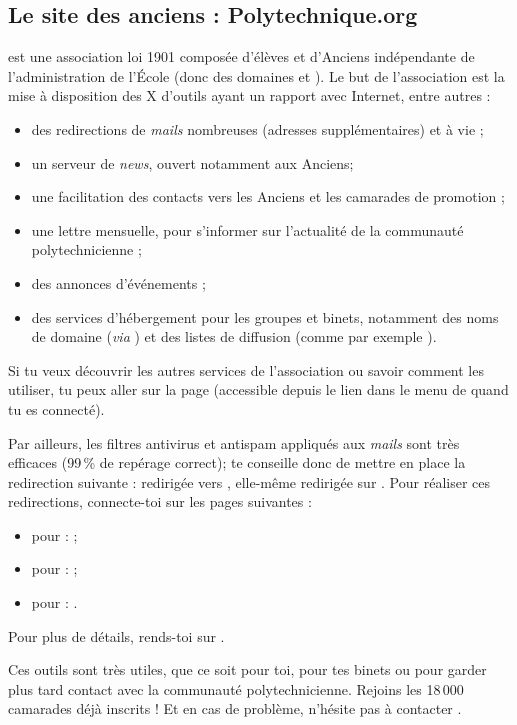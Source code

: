 \subsection{Le site des anciens : Polytechnique.org}
 est une association loi 1901 composée d'élèves et d'Anciens
 indépendante de l'administration de l'\'Ecole (donc des domaines 
 et ). Le but de l'association est la mise à disposition des X d'outils
ayant un rapport avec Internet, entre autres :
\begin{itemize}
  \item des redirections de \emph{mails} nombreuses (adresses supplémentaires) et à vie ;
  \item un serveur de \emph{news}, ouvert notamment aux Anciens;
  \item une facilitation des contacts vers les Anciens et les camarades de promotion ;
  \item une lettre mensuelle, pour s'informer sur l'actualité de la communauté polytechnicienne ;
  \item des annonces d'événements ;
  \item des services d'hébergement pour les groupes et binets, notamment des noms de domaine (\emph{via} ) et des listes de diffusion (comme par exemple ).
\end{itemize}
Si tu veux découvrir les autres services de l'association ou savoir
comment les utiliser, tu peux aller sur la page
 (accessible depuis
le lien  dans le menu de 
quand tu es connecté).

Par ailleurs, les filtres antivirus et antispam appliqués aux \emph{mails} sont très efficaces (99\,\% de repérage correct);  te conseille donc de mettre en place la redirection suivante :
redirigée vers ,
elle-même redirigée sur .
Pour réaliser ces redirections, connecte-toi sur les pages suivantes :
\begin{itemize}
  \item pour  :  ;
  \item pour  :  ;
  \item pour  : .
\end{itemize}
Pour plus de détails, rends-toi sur .


 Ces outils sont très utiles, que
ce soit pour toi, pour tes binets ou pour garder plus tard contact avec la communauté polytechnicienne. Rejoins
les 18\,000 camarades déjà inscrits ! Et en cas de problème, n'hésite pas à contacter
.
